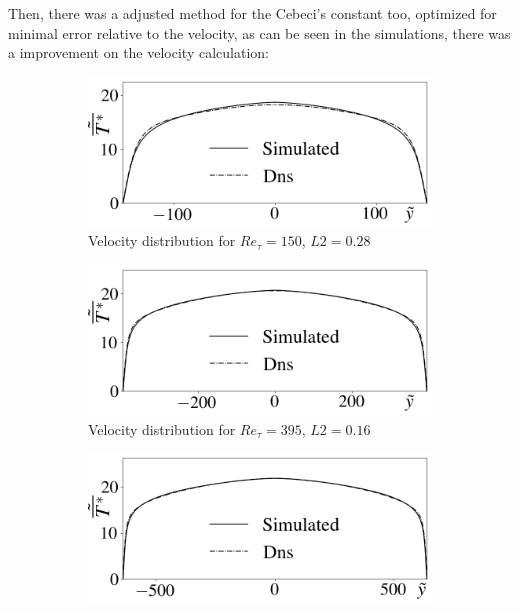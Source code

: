 \documentclass[10pt]{article} %
\begin{document}
Then, there was a adjusted method for the Cebeci's constant too, optimized for minimal error relative to the velocity, as can be seen in the simulations, there was a improvement on the velocity calculation:


\begin{figure}[!h]
	\centering
	\begin{subfigure}[t]{0.5\textwidth}
		\centering
		\includegraphics[angle=0, scale=0.24]{fotos_formatacao_final/Temperature_150_Amodeled}
		\caption{Velocity distribution for $Re_\tau = 150$, $L2 = 0.28$}
	\end{subfigure}
	\begin{subfigure}[t]{0.45\textwidth}
		\centering
		\includegraphics[angle=0, scale=0.24]{fotos_formatacao_final/Temperature_395_Amodeled}
		\caption{Velocity distribution for $Re_\tau = 395$, $L2 = 0.16$}
	\end{subfigure}
	\begin{subfigure}[t]{0.5\textwidth}
		\centering
		\includegraphics[angle=0, scale=0.24]{fotos_formatacao_final/Temperature_640_Amodeled}

\end{subfigure}
\end{figure}
\end{document}
